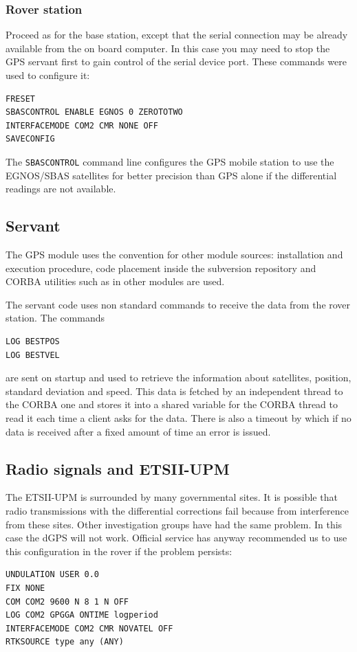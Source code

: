 \subsubsection{Rover station}
Proceed as for the base station, except that the serial connection may be already available from the on board computer. In this case you may need to stop the GPS servant first to gain control of the serial device port. These commands were used to configure it:
\begin{verbatim}
FRESET
SBASCONTROL ENABLE EGNOS 0 ZEROTOTWO
INTERFACEMODE COM2 CMR NONE OFF
SAVECONFIG
\end{verbatim}
The \verb|SBASCONTROL| command line configures the GPS mobile station to use the EGNOS/SBAS satellites for better precision than GPS alone if the differential readings are not available.

\subsection{Servant}
The GPS module uses the convention for other module sources: installation and execution procedure, code placement inside the subversion repository and CORBA utilities such as in other modules are used.

The servant code uses non standard commands to receive the data from the rover station.
The commands
\begin{verbatim}
LOG BESTPOS
LOG BESTVEL
\end{verbatim} 
are sent on startup and used to retrieve the information about satellites, position, standard deviation and speed. This data is fetched by an independent thread to the CORBA one and stores it into a shared variable for the CORBA thread to read it each time a client asks for the data. There is also a timeout by which if no data is received after a fixed amount of time an error is issued.

\subsection{Radio signals and ETSII-UPM}
The ETSII-UPM is surrounded by many governmental sites. It is possible that radio transmissions with the differential corrections fail because from interference from these sites. Other investigation groups have had the same problem. In this case the dGPS will not work. Official service has anyway recommended us to use this configuration in the rover if the problem persists:
\begin{verbatim}
UNDULATION USER 0.0
FIX NONE
COM COM2 9600 N 8 1 N OFF
LOG COM2 GPGGA ONTIME logperiod
INTERFACEMODE COM2 CMR NOVATEL OFF
RTKSOURCE type any (ANY)
\end{verbatim}

